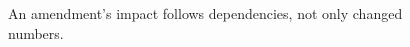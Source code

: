 \begin{figure}[H]
\centering
{}
\caption{An amendment's impact follows dependencies, not only changed numbers.}\label{fig:teach-P-03-product-09}
\end{figure}
